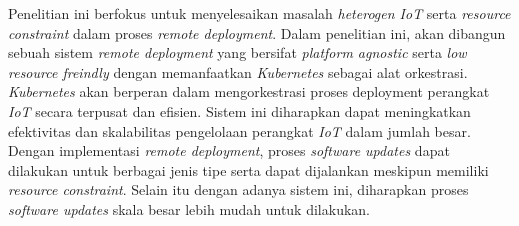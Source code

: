 Penelitian ini berfokus untuk menyelesaikan masalah \textit{heterogen IoT} serta \textit{resource constraint} dalam proses \textit{remote deployment}. Dalam penelitian ini, akan dibangun sebuah sistem \textit{remote deployment} yang bersifat \textit{platform agnostic} serta \textit{low resource freindly} dengan memanfaatkan \textit{Kubernetes} sebagai alat orkestrasi. \textit{Kubernetes} akan berperan dalam mengorkestrasi proses deployment perangkat \textit{IoT} secara terpusat dan efisien. Sistem ini diharapkan dapat meningkatkan efektivitas dan skalabilitas pengelolaan perangkat \textit{IoT} dalam jumlah besar. Dengan implementasi \textit{remote deployment}, proses \textit{software updates} dapat dilakukan untuk berbagai jenis tipe serta dapat dijalankan meskipun memiliki \textit{resource constraint}. Selain itu dengan adanya sistem ini, diharapkan proses \textit{software updates} skala besar lebih mudah untuk dilakukan.





